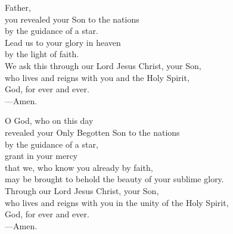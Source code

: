 \prayer

\begin{prayerverse}

Father,\\
you revealed your Son to the nations\\
by the guidance of a star.\\
Lead us to your glory in heaven\\
by the light of faith.\\
We ask this through our Lord Jesus Christ, your Son,\\
who lives and reigns with you and the Holy Spirit,\\
God, for ever and ever.\\
{\color{red}---\thinspace}Amen.

\end{prayerverse}


\begin{prayerverse}

O God, who on this day\\
revealed your Only Begotten Son to the nations\\
by the guidance of a star,\\
grant in your mercy\\
that we, who know you already by faith,\\
may be brought to behold the beauty of your sublime glory.\\
Through our Lord Jesus Christ, your Son,\\
who lives and reigns with you in the unity of the Holy Spirit,\\
God, for ever and ever.\\
{\color{red}---\thinspace}Amen.

\end{prayerverse}